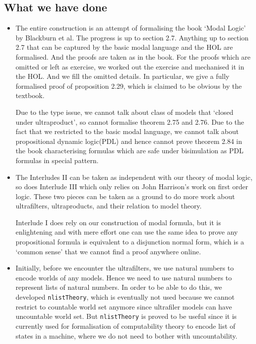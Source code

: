 \documentclass[letterpaper]{article}
\begin{document}
\subsection{What we have done}

\begin{itemize}
\item The entire construction is an attempt of formalising the book `Modal Logic' by Blackburn et al. The progress is up to section 2.7. Anything up to section 2.7 that can be captured by the basic modal language and the HOL are formalised. And the proofs are taken as in the book. For the proofs which are omitted or left as exercise, we worked out the exercise and mechanised it in the HOL. And we fill the omitted details. In particular, we give a fully formalised proof of proposition 2.29, which is claimed to be obvious by the textbook.

Due to the type issue, we cannot talk about class of models that `closed under ultraproduct', so cannot formalise theorem 2.75 and 2.76.
Due to the fact that we restricted to the basic modal language, we cannot talk about propositional dynamic logic(PDL) and hence cannot prove theorem 2.84 in the book characterising formulas which are safe under bisimulation as PDL formulas in special pattern.


\item The Interludes II can be taken as independent with our theory of modal logic, so does Interlude III which only relies on John Harrison's work on first order logic. These two pieces can be taken as a ground to do more work about ultrafilters, ultraproducts, and their relation to model theory.

Interlude I does rely on our construction of modal formula, but it is enlightening and with mere effort one can use the same idea to prove any propositional formula is equivalent to a disjunction normal form, which is a `common sense' that we cannot find a proof anywhere online. 

\item Initially, before we encounter the ultrafilters, we use natural numbers to encode worlds of any models. Hence we need to use natural numbers to represent lists of natural numbers. In order to be able to do this, we developed \texttt{nlistTheory}, which is eventually not used because we cannot restrict to countable world set anymore since ultrafiler models can have uncountable world set. But \texttt{nlistTheory} is proved to be useful since it is currently used for formalisation of computability theory to encode list of states in a machine, where we do not need to bother with uncountability.
\end{itemize}
\end{document}

